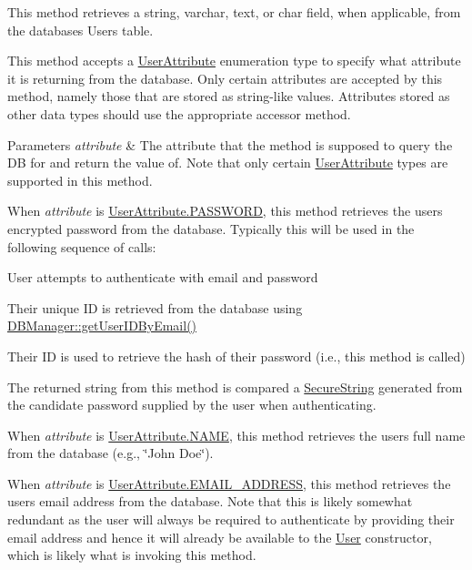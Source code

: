 This method retrieves a string, varchar, text, or char field, when applicable, from the database\textquotesingle{}s Users table.

This method accepts a \mbox{\hyperlink{enumcom_1_1activitytracker_1_1_user_attribute}{User\+Attribute}} enumeration type to specify what attribute it is returning from the database. Only certain attributes are accepted by this method, namely those that are stored as string-\/like values. Attributes stored as other data types should use the appropriate accessor method.


\begin{DoxyParams}{Parameters}
{\em attribute} & The attribute that the method is supposed to query the DB for and return the value of. Note that only certain \mbox{\hyperlink{enumcom_1_1activitytracker_1_1_user_attribute}{User\+Attribute}} types are supported in this method.
\begin{DoxyItemize}
\item When {\itshape attribute} is \mbox{\hyperlink{enumcom_1_1activitytracker_1_1_user_attribute_aa893eac0362a28e73a599ce1ba141d40}{User\+Attribute.\+P\+A\+S\+S\+W\+O\+RD}}, this method retrieves the user\textquotesingle{}s encrypted password from the database. Typically this will be used in the following sequence of calls\+:
\begin{DoxyEnumerate}
\item User attempts to authenticate with email and password
\item Their unique ID is retrieved from the database using \mbox{\hyperlink{classcom_1_1activitytracker_1_1_d_b_manager_a195dcdeabdd00facb19d720976dd3f53}{D\+B\+Manager\+::get\+User\+I\+D\+By\+Email()}}
\item Their ID is used to retrieve the hash of their password (i.\+e., this method is called)
\item The returned string from this method is compared a \mbox{\hyperlink{classcom_1_1activitytracker_1_1_secure_string}{Secure\+String}} generated from the candidate password supplied by the user when authenticating.
\end{DoxyEnumerate}
\item When {\itshape attribute} is \mbox{\hyperlink{enumcom_1_1activitytracker_1_1_user_attribute_aac51a5dfcaaa9e5304d37d74fc888af4}{User\+Attribute.\+N\+A\+ME}}, this method retrieves the user\textquotesingle{}s full name from the database (e.\+g., \char`\"{}\+John Doe\char`\"{}).
\item When {\itshape attribute} is \mbox{\hyperlink{enumcom_1_1activitytracker_1_1_user_attribute_a8b9fa2ebf911262dfa24c683ff2a3b9c}{User\+Attribute.\+E\+M\+A\+I\+L\+\_\+\+A\+D\+D\+R\+E\+SS}}, this method retrieves the user\textquotesingle{}s email address from the database. Note that this is likely somewhat redundant as the user will always be required to authenticate by providing their email address and hence it will already be available to the \mbox{\hyperlink{classcom_1_1activitytracker_1_1_user}{User}} constructor, which is likely what is invoking this method. 

\end{DoxyItemize}
\end{DoxyParams}
